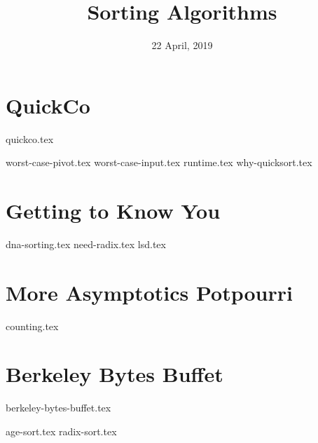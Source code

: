 \documentclass[11pt]{exam}
\title{Sorting Algorithms}
\date{22 April, 2019}
\begin{document}
\maketitle

\section{QuickCo}
{quickco.tex}
\begin{questions}
{worst-case-pivot.tex}
{worst-case-input.tex}
{runtime.tex}
{why-quicksort.tex}
\end{questions}



\section{Getting to Know You}
\begin{questions}
{dna-sorting.tex}
{need-radix.tex}
{lsd.tex}
\end{questions}

\section{More Asymptotics Potpourri}
{counting.tex}

\section{Berkeley Bytes Buffet}
{berkeley-bytes-buffet.tex}
\begin{questions}
{age-sort.tex}
{radix-sort.tex}
\end{questions}
\end{document}
